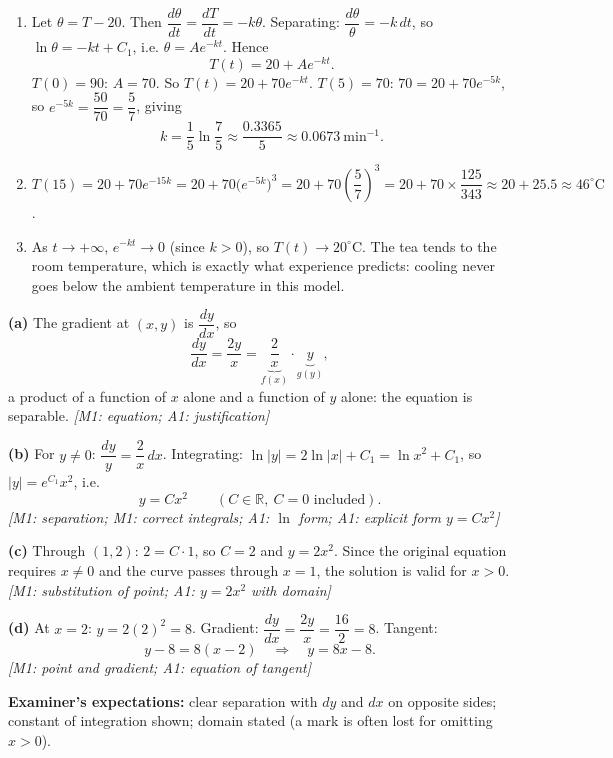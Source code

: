 \documentclass[11pt]{article}
\begin{document}
\begin{corrige}
\begin{enumerate}
\item Let $\theta=T-20$. Then $\dfrac{d\theta}{dt}=\dfrac{dT}{dt}=-k\theta$. Separating: $\dfrac{d\theta}{\theta}=-k\,dt$, so $\ln\theta=-kt+C_1$, i.e. $\theta=Ae^{-kt}$. Hence
\[ T(t)=20+Ae^{-kt}. \]
$T(0)=90$: $A=70$. So $T(t)=20+70e^{-kt}$.
$T(5)=70$: $70=20+70e^{-5k}$, so $e^{-5k}=\dfrac{50}{70}=\dfrac{5}{7}$, giving
\[ k=\frac{1}{5}\ln\frac{7}{5}\approx\frac{0.3365}{5}\approx 0.0673\ \mathrm{min^{-1}}. \]
\item $T(15)=20+70e^{-15k}=20+70\bigl(e^{-5k}\bigr)^{3}=20+70\left(\dfrac{5}{7}\right)^{3}=20+70\times\dfrac{125}{343}\approx 20+25.5\approx \boxed{46^{\circ}\text{C}}$.
\item As $t\to+\infty$, $e^{-kt}\to 0$ (since $k>0$), so $T(t)\to 20^{\circ}$C. The tea tends to the room temperature, which is exactly what experience predicts: cooling never goes below the ambient temperature in this model.
\end{enumerate}
\end{corrige}

\begin{corrige}
\textbf{(a)} The gradient at $(x,y)$ is $\dfrac{dy}{dx}$, so
\[ \frac{dy}{dx}=\frac{2y}{x}= \underbrace{\frac{2}{x}}_{f(x)}\cdot\underbrace{y}_{g(y)}, \]
a product of a function of $x$ alone and a function of $y$ alone: the equation is separable. \hfill \emph{[M1: equation; A1: justification]}

\textbf{(b)} For $y\neq 0$: $\dfrac{dy}{y}=\dfrac{2}{x}\,dx$. Integrating: $\ln|y|=2\ln|x|+C_1=\ln x^{2}+C_1$, so $|y|=e^{C_1}x^{2}$, i.e.
\[ y=Cx^{2}\qquad (C\in\mathbb{R},\ C=0\text{ included}). \]
\emph{[M1: separation; M1: correct integrals; A1: $\ln$ form; A1: explicit form $y=Cx^{2}$]}

\textbf{(c)} Through $(1,2)$: $2=C\cdot 1$, so $C=2$ and $\boxed{y=2x^{2}}$. Since the original equation requires $x\neq 0$ and the curve passes through $x=1$, the solution is valid for $x>0$. \hfill \emph{[M1: substitution of point; A1: $y=2x^{2}$ with domain]}

\textbf{(d)} At $x=2$: $y=2(2)^{2}=8$. Gradient: $\dfrac{dy}{dx}=\dfrac{2y}{x}=\dfrac{16}{2}=8$. Tangent:
\[ y-8=8(x-2)\quad\Longrightarrow\quad \boxed{y=8x-8}. \]
\emph{[M1: point and gradient; A1: equation of tangent]}

\textbf{Examiner's expectations:} clear separation with $dy$ and $dx$ on opposite sides; constant of integration shown; domain stated (a mark is often lost for omitting $x>0$).
\end{corrige}
\end{document}
